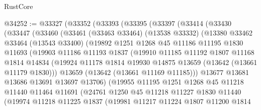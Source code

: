 \begin{lexlean}{RustCore}
\begin{coremodule}
@34252 := @33327
    (@33352
      (@33393
        (@33395
          (@33397
            (@33414
              (@33430
                (@33447
                  (@33460
                    (@33461
                      (@33463 @33464)
                      (@13538 @33332)
                      (@13380
                        @33462
                        @33464
                        (@13543 @33400)
                        (@19892
                          @1251
                          @1268
                          @45
                          @11186
                          @11195
                          @1830
                          @11693
                          (@19903
                            @11186
                            @11193
                            @1837
                            (@19910
                              @11185
                              @11192
                              @1807
                              @11168
                              @1814
                              @14834
                              (@19924
                                @11178
                                @1814
                                @19930
                                @14875
                                @13659
                                (@13642 (@13661 @11179 @1830)))
                              @13659
                              (@13642 (@13661 @11169 @11185)))
                            @13677
                            @13681
                            @13686
                            @13691
                            @13697
                            @13706)
                          (@19955
                            @11195
                            @1251
                            @1268
                            @45
                            @11218
                            @11440
                            @11464
                            @11691
                            (@24761
                              @1250
                              @45
                              @11218
                              @11227
                              @1830
                              @11440
                              (@19974
                                @11218
                                @11225
                                @1837
                                (@19981
                                  @11217
                                  @11224
                                  @1807
                                  @11200
                                  @1814

\end{coremodule}
\end{lexlean}
